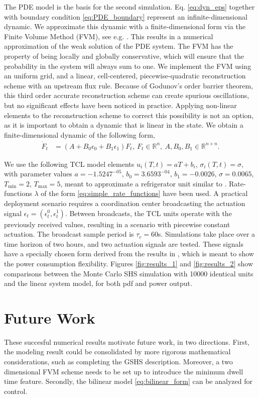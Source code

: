 \documentclass[submission,copyright,creativecommons]{eptcs}
\begin{document}
The PDE model is the basis for the second simulation. Eq. \eqref{eq:dyn_eps} together with boundary condition \eqref{eq:PDE_boundary} represent an infinite-dimensional dynamic. We approximate this dynamic with a finite-dimensional  form via the Finite Volume  Method (FVM), see e.g. \cite{ferziger2002computational}. This results in a numerical approximation of the weak solution of the PDE system. The FVM has the property of being locally and globally conservative, which will ensure that the probability in the system will always sum to one. We implement the FVM using an uniform grid, and a linear, cell-centered, piecewise-quadratic reconstruction scheme with an upstream flux rule. Because of Godunov's order barrier theorem, this third order accurate reconstruction scheme can create spurious oscillations, but no significant effects have been noticed in practice. Applying non-linear elements to the reconstruction scheme to correct this possibility is not an option, as it is important to obtain a dynamic that is linear in the state. We obtain a finite-dimensional dynamic of the following form,
\begin{align}
  \dot{F}_t &= (  A + B_0\epsilon_0  + B_1\epsilon_1 ) F_t,~ F_t \in \mathbb{R}^{n},~A, B_0, B_1 \in \mathbb{R}^{n \times n}. \label{eq:bilinear_form}
\end{align}

We use the following TCL model elements $u_i(T,t)= aT +b_i$,  $\sigma_i(T,t) = \sigma$,  with parameter values $a=-1.5247^{-05}$, $b_0=3.6593^{-04}$, $b_1=-0.0026$, $\sigma=0.0065$, $T_{\min}=2$, $T_{\max}=5$, meant to approximate a refrigerator unit similar to \cite{totu2013control, totu2014demand}. Rate-functions $\lambda$ of the form \eqref{eq:simple_rate_functions} have been used. A practical deployment scenario requires a coordination center broadcasting the actuation signal $\epsilon_t=(\epsilon^0_t,\epsilon^1_t)$. Between broadcasts, the TCL units operate with the previously received values, resulting in a scenario with piecewise constant actuation. The broadcast sample period is $\tau_c=60$s. Simulations take place over a time horizon of  two hours, and two actuation signals are tested. These signals have a specially chosen form derived from the results in \cite{totu2014demand}, which is meant to show the power consumption flexibility. Figures \ref{fig:results_1} and \ref{fig:results_2} show comparisons between the Monte Carlo SHS simulation with 10000 identical units and the linear system model, for both pdf and power output. 

\section{Future Work} \label{sec:conclusion}
These succesful numerical results motivate future work, in two directions. First, the modeling result could be consolidated by more rigorous mathematical considerations, such as completing the GSHS description. Moreover, a two dimensional FVM scheme needs to be set up to introduce the minimum dwell time feature. Secondly, the bilinear model \eqref{eq:bilinear_form} can be analyzed for control. 
\end{document}
